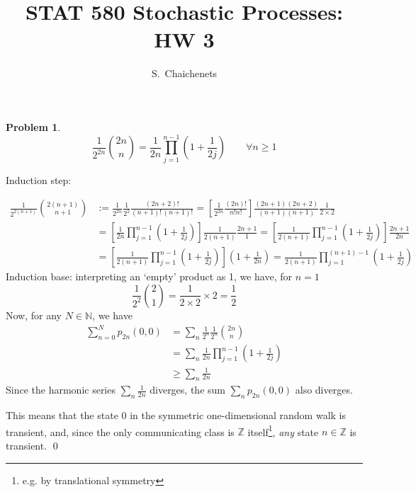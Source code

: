 \documentclass[8pt,notitlepage,letter]{report}
\newtheorem{problem}{Problem}
\newenvironment{solution}[1][Solution]{\begin{trivlist}
    \item[\hskip \labelsep {\bfseries #1}]}{\end{trivlist}}
\begin{document}
\title{STAT 580 Stochastic Processes: HW 3}
\author{ S.\ Chaichenets }
\maketitle



\begin{problem}
\small
\begin{equation}
\frac{1}{2^{2n}} {2n \choose n} = \frac{1}{2n} \prod_{j=1}^{n-1} \left(1+\frac{1}{2j}\right)
\qquad \forall n\geq 1
\end{equation}
\normalsize
\end{problem}

\begin{solution}
Induction step:

\begin{equation}
\begin{split}
\frac{1}{2^{2(n+1)}} {2(n+1) \choose n+1} 
	& := \frac{1}{2^{2n}}\frac{1}{2^2} \frac{(2n+2)!}{(n+1)!\,(n+1)!} 
	 = \left[ \frac{1}{2^{2n}}\frac{(2n)!}{n!n!} \right]
		\frac{(2n+1)(2n+2)}{(n+1)(n+1)}\frac{1}{2\times2} 			\\
	& = \left[ \frac{1}{2n}\prod_{j=1}^{n-1} \left(1+\frac{1}{2j}\right) \right]
		\frac{1}{2(n+1)}\frac{2n+1}{1} 
	 = \left[ \frac{1}{2(n+1)}\prod_{j=1}^{n-1} \left(1+\frac{1}{2j}\right) \right]
		\frac{2n+1}{2n}								\\
	& = \left[ \frac{1}{2(n+1)}\prod_{j=1}^{n-1} \left(1+\frac{1}{2j}\right) \right]
		\left( 1 + \frac{1}{2n} \right)
	 = \frac{1}{2(n+1)}\prod_{j=1}^{(n+1)-1} \left(1+\frac{1}{2j}\right)
\end{split}
\end{equation}
Induction base: interpreting an `empty' product as 1, we have, for $n=1$
$$
\frac{1}{2^2}{2 \choose 1} = \frac{1}{2\times2} \times 2 = \frac{1}{2}
$$
Now, for any $N\in \mathbb{N}$, we have
\begin{equation}
\begin{split}
\sum_{n=0}^{N} p_{2n}(0,0) &= \sum_n \frac{1}{2^n}\frac{1}{2^n}{2n \choose n}		\\
			&= \sum_n {\frac{1}{2n} \prod_{j=1}^{n-1} \left(1+\frac{1}{2j}\right)}	\\
			&\geq	\sum_{n}\frac{1}{2n}
\end{split}
\end{equation}
Since the harmonic series $\sum_n \frac{1}{2n}$ diverges, 
the sum $\sum_{n} p_{2n}(0,0)$ also diverges.

This means that the state $0$ in the symmetric one-dimensional random walk is transient,
and, since the only communicating class is $\mathbb{Z}$ itself\footnote{
	e.g. by translational symmetry
}, {\it any} state $n\in \mathbb{Z}$ is transient.
\qed
\end{solution}
\end{document}
